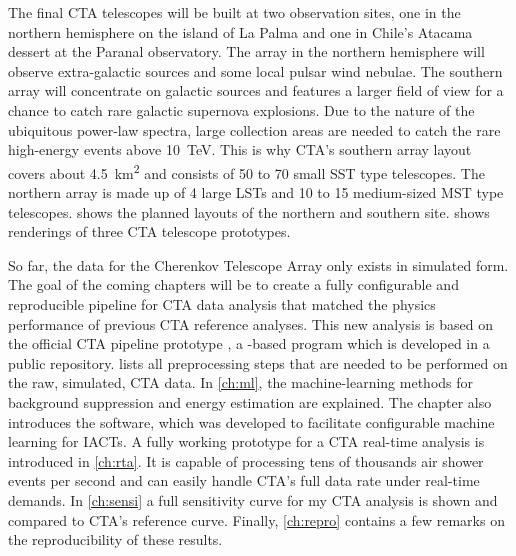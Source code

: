 The final CTA telescopes will be built at two observation sites, one in the northern hemisphere on the island of La Palma and one 
in Chile's Atacama dessert at the Paranal observatory. 
The array in the northern hemisphere will observe extra-galactic sources and some local pulsar wind nebulae. The southern array
will concentrate on galactic sources and features a larger field of view for a chance to catch 
rare galactic supernova explosions.  
Due to the nature of the ubiquitous power-law spectra, large collection areas are needed to catch the rare high-energy 
events above \SI{10}{TeV}. This is why CTA's southern array layout covers about \SI{4.5}{\square\kilo\metre} and consists of 50 to 70 
small SST type telescopes. The northern array is made up of 4 large LSTs and 10 to 15 medium-sized MST type telescopes.
 shows the planned layouts of the northern and southern site.  shows renderings 
of three CTA telescope prototypes. 

So far, the data for the Cherenkov Telescope Array only exists in simulated form.
The goal of the coming chapters will be to create a fully configurable and reproducible pipeline for CTA data analysis that 
matched the physics performance of previous CTA reference analyses.
This new analysis is based on the official CTA pipeline prototype \ctapipe, a \python-based program
which is developed in a public repository.
 lists all preprocessing steps that are needed to be performed on the raw, simulated, CTA data. 
In \cref{ch:ml}, the machine-learning methods for background suppression and energy estimation are explained.
The chapter also introduces the \aicttools software, which was developed to facilitate configurable machine learning
for IACTs.
A fully working prototype for a CTA real-time analysis is introduced in \cref{ch:rta}. It is capable of processing tens of thousands 
air shower events per second and can easily handle CTA's full data rate under real-time demands.
In \cref{ch:sensi} a full sensitivity curve for my CTA analysis is shown and compared to CTA’s reference curve.
Finally, \cref{ch:repro} contains a few remarks on the reproducibility of these results.

